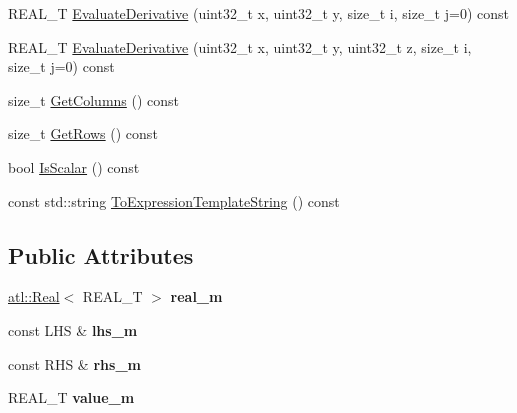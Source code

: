 \begin{DoxyCompactItemize}
\item 
R\+E\+A\+L\+\_\+\+T \hyperlink{structatl_1_1_subtract_aa1c554a245afa879ebab6e68f592bb90}{Evaluate\+Derivative} (uint32\+\_\+t x, uint32\+\_\+t y, size\+\_\+t i, size\+\_\+t j=0) const 
\item 
R\+E\+A\+L\+\_\+\+T \hyperlink{structatl_1_1_subtract_ae9ca2e237fac48dd380435215a8bc224}{Evaluate\+Derivative} (uint32\+\_\+t x, uint32\+\_\+t y, uint32\+\_\+t z, size\+\_\+t i, size\+\_\+t j=0) const 
\item 
size\+\_\+t \hyperlink{structatl_1_1_subtract_a855cb338fa3c5b1abd2c3ef7076d3da6}{Get\+Columns} () const 
\item 
size\+\_\+t \hyperlink{structatl_1_1_subtract_a3178686169bc6c020f6191f0e1d89887}{Get\+Rows} () const 
\item 
bool \hyperlink{structatl_1_1_subtract_a230ee7ae322737b12c84136e534a5624}{Is\+Scalar} () const 
\item 
const std\+::string \hyperlink{structatl_1_1_subtract_a5282da95ee1c8d921dc17e642ce20d94}{To\+Expression\+Template\+String} () const 
\end{DoxyCompactItemize}
\subsection*{Public Attributes}
\begin{DoxyCompactItemize}
\item 
\hypertarget{structatl_1_1_subtract_a418b68d42f9655c3e579e2f41430c680}{\hyperlink{structatl_1_1_real}{atl\+::\+Real}$<$ R\+E\+A\+L\+\_\+\+T $>$ {\bfseries real\+\_\+m}}\label{structatl_1_1_subtract_a418b68d42f9655c3e579e2f41430c680}

\item 
\hypertarget{structatl_1_1_subtract_a50d122ada13d9dcec017d3428e1a8895}{const L\+H\+S \& {\bfseries lhs\+\_\+m}}\label{structatl_1_1_subtract_a50d122ada13d9dcec017d3428e1a8895}

\item 
\hypertarget{structatl_1_1_subtract_a51c853273f222f5c2c7c23bd6c46cea9}{const R\+H\+S \& {\bfseries rhs\+\_\+m}}\label{structatl_1_1_subtract_a51c853273f222f5c2c7c23bd6c46cea9}

\item 
\hypertarget{structatl_1_1_subtract_ae074418a06e7fed14d436cac9edd8f8d}{R\+E\+A\+L\+\_\+\+T {\bfseries value\+\_\+m}}\label{structatl_1_1_subtract_ae074418a06e7fed14d436cac9edd8f8d}

\end{DoxyCompactItemize}


